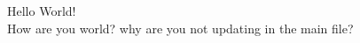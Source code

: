\documentclass[../capacities_main.tex]{subfiles}
\begin{document}
	
	Hello World! \\
	How are you world? why are you not updating in the main file?
\end{document}
